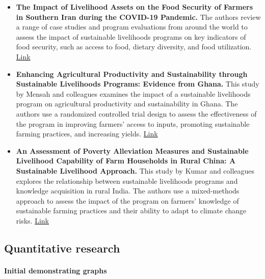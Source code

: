 \documentclass[
  letterpaper,
  DIV=11,
  numbers=noendperiod]{scrartcl}
\let\oldparagraph\paragraph
\renewcommand{\paragraph}[1]{\oldparagraph{#1}\mbox{}}
\begin{document}
\begin{itemize}
\item
  \textbf{The Impact of Livelihood Assets on the Food Security of
  Farmers in Southern Iran during the COVID-19 Pandemic.} The authors
  review a range of case studies and program evaluations from around the
  world to assess the impact of sustainable livelihoods programs on key
  indicators of food security, such as access to food, dietary
  diversity, and food utilization.
  \href{https://www.ncbi.nlm.nih.gov/pmc/articles/PMC8156269/}{Link}
\item
  \textbf{Enhancing Agricultural Productivity and Sustainability through
  Sustainable Livelihoods Programs: Evidence from Ghana.} This study by
  Mensah and colleagues examines the impact of a sustainable livelihoods
  program on agricultural productivity and sustainability in Ghana. The
  authors use a randomized controlled trial design to assess the
  effectiveness of the program in improving farmers' access to inputs,
  promoting sustainable farming practices, and increasing yields.
  \href{https://www.ncbi.nlm.nih.gov/pmc/articles/PMC6740034/}{Link}
\item
  \textbf{An Assessment of Poverty Alleviation Measures and Sustainable
  Livelihood Capability of Farm Households in Rural China: A Sustainable
  Livelihood Approach.} This study by Kumar and colleagues explores the
  relationship between sustainable livelihoods programs and knowledge
  acquisition in rural India. The authors use a mixed-methods approach
  to assess the impact of the program on farmers' knowledge of
  sustainable farming practices and their ability to adapt to climate
  change risks. \href{https://www.mdpi.com/2077-0472/11/12/1230}{Link}
\end{itemize}

\hypertarget{quantitative-research}{%
\subsection{Quantitative research}\label{quantitative-research}}

\hypertarget{initial-demonstrating-graphs}{%
\paragraph{Initial demonstrating
graphs}\label{initial-demonstrating-graphs}}
\end{document}

